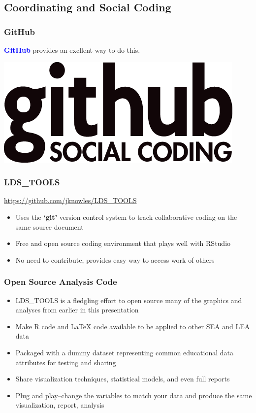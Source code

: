 \documentclass[12pt,handout]{beamer}
\begin{document}
\subsection{Coordinating and Social Coding}
\begin{frame}
\frametitle{GitHub}
\Large \textbf{\textcolor{blue}{GitHub}} \normalsize provides an excllent way to do this. 
\vspace{.5in}
\begin{center}
\includegraphics[width=.45\textwidth]{GitHublogo}
\end{center}
\end{frame}



\begin{frame}
\frametitle{LDS\_TOOLS}
\vspace{.18in}
\Large  \textcolor{blue}{\href{https://github.com/jknowles/LDS_TOOLS}{https://github.com/jknowles/LDS\_TOOLS}}
\begin{itemize}
  \item Uses the \textbf{`git'} version control system to track collaborative coding on the same source document
  \item Free and open source coding environment that plays well with RStudio
  \item No need to contribute, provides easy way to access work of others
\end{itemize}
\end{frame}

\begin{frame}
\frametitle{Open Source Analysis Code}
\begin{itemize}
  \item LDS\_TOOLS is a fledgling effort to open source many of the graphics and analyses from earlier in this presentation
  \item Make R code and \LaTeX{} code available to be applied to other SEA and LEA data
  \item Packaged with a dummy dataset representing common educational data attributes for testing and sharing 
  \item Share visualization techniques, statistical models, and even full reports
  \item Plug and play--change the variables to match your data and produce the same visualization, report, analysis
\end{itemize}
\end{frame}
\end{document}
